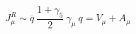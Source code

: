 \begin{equation}
J_\mu^R \sim \overline{q}~\frac{1+\gamma_5}{2}~\gamma_\mu~q=V_\mu+A_\mu
\end{equation}

